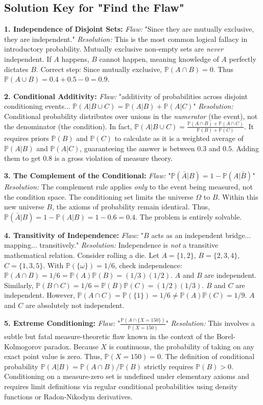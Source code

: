 \documentclass[12pt, a4paper]{article}
\theoremstyle{definition}
\theoremstyle{remark}
\newcommand{\Prob}{\mathbb{P}}
\newcommand{\W}{\Omega}
\newcommand{\1}{\mathbf{1}}
\begin{document}
\newpage
\subsection*{Solution Key for "Find the Flaw"}
\textbf{1. Independence of Disjoint Sets:}
\textit{Flaw:} "Since they are mutually exclusive, they are independent."
\textit{Resolution:} This is the most common logical fallacy in introductory probability. Mutually exclusive non-empty sets are \textit{never} independent. If $A$ happens, $B$ cannot happen, meaning knowledge of $A$ perfectly dictates $B$. Correct step: Since mutually exclusive, $\Prob(A \cap B) = 0$. Thus $\Prob(A \cup B) = 0.4 + 0.5 - 0 = 0.9$.

\textbf{2. Conditional Additivity:}
\textit{Flaw:} "additivity of probabilities across disjoint conditioning events... $\Prob(A | B \cup C) = \Prob(A|B) + \Prob(A|C)$"
\textit{Resolution:} Conditional probability distributes over unions in the \textit{numerator} (the event), not the denominator (the condition). In fact, $\Prob(A | B \cup C) = \frac{\Prob(A \cap B) + \Prob(A \cap C)}{\Prob(B) + \Prob(C)}$. It requires priors $\Prob(B)$ and $\Prob(C)$ to calculate as it is a weighted average of $\Prob(A|B)$ and $\Prob(A|C)$, guaranteeing the answer is between $0.3$ and $0.5$. Adding them to get $0.8$ is a gross violation of measure theory.

\textbf{3. The Complement of the Conditional:}
\textit{Flaw:} "$\Prob(\bar{A}|B) = 1 - \Prob(A|\bar{B})$"
\textit{Resolution:} The complement rule applies \textit{only} to the event being measured, not the condition space. The conditioning set limits the universe $\W$ to $B$. Within this new universe $B$, the axioms of probability remain identical. Thus, $\Prob(\bar{A}|B) = 1 - \Prob(A|B) = 1 - 0.6 = 0.4$. The problem is entirely solvable.

\textbf{4. Transitivity of Independence:}
\textit{Flaw:} "$B$ acts as an independent bridge... mapping... transitively."
\textit{Resolution:} Independence is \textit{not} a transitive mathematical relation. Consider rolling a die. Let $A = \{1, 2\}$, $B = \{2, 3, 4\}$, $C = \{1, 3, 5\}$. With $\Prob(\{\omega\}) = 1/6$, check independence: $\Prob(A \cap B) = 1/6 = \Prob(A)\Prob(B) = (1/3)(1/2)$. $A$ and $B$ are independent. Similarly, $\Prob(B \cap C) = 1/6 = \Prob(B)\Prob(C) = (1/2)(1/3)$. $B$ and $C$ are independent. However, $\Prob(A \cap C) = \Prob(\{1\}) = 1/6 \neq \Prob(A)\Prob(C) = 1/9$. $A$ and $C$ are absolutely not independent.

\textbf{5. Extreme Conditioning:}
\textit{Flaw:} "$\frac{\Prob(A \cap \{X=150\})}{\Prob(X=150)}$"
\textit{Resolution:} This involves a subtle but fatal measure-theoretic flaw known in the context of the Borel-Kolmogorov paradox. Because $X$ is continuous, the probability of taking on any exact point value is zero. Thus, $\Prob(X=150) = 0$. The definition of conditional probability $\Prob(A|B) = \Prob(A \cap B)/\Prob(B)$ strictly requires $\Prob(B) > 0$. Conditioning on a measure-zero set is undefined under elementary axioms and requires limit definitions via regular conditional probabilities using density functions or Radon-Nikodym derivatives.
\end{document}
